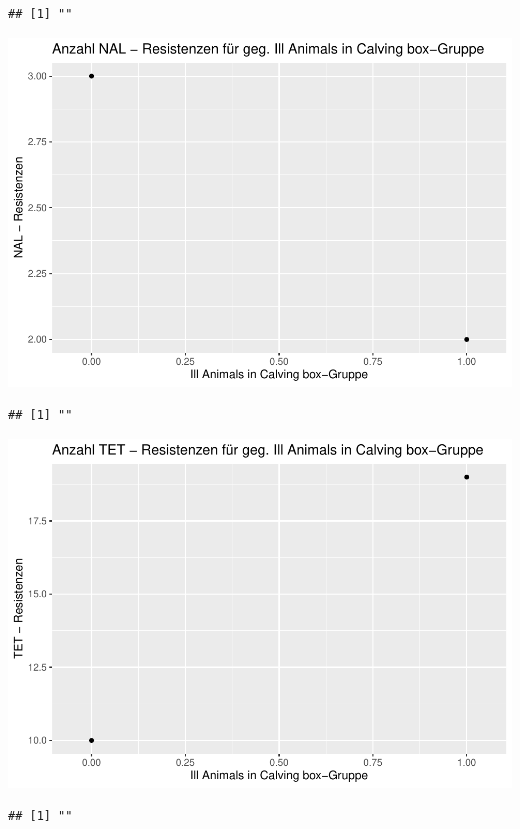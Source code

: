 \documentclass[
]{article}
\begin{document}
\begin{verbatim}
## [1] ""
\end{verbatim}

\includegraphics{NResistenzen_files/figure-latex/unnamed-chunk-7-27.pdf}

\begin{verbatim}
## [1] ""
\end{verbatim}

\includegraphics{NResistenzen_files/figure-latex/unnamed-chunk-7-28.pdf}

\begin{verbatim}
## [1] ""
\end{verbatim}
\end{document}

